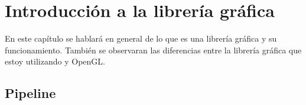 \chapter{Introducción a la librería gráfica}
En este capítulo se hablará en general de lo que es una librería gráfica y su funcionamiento. También se observaran las diferencias entre la librería gráfica que estoy utilizando y OpenGL.
\section{Pipeline}
